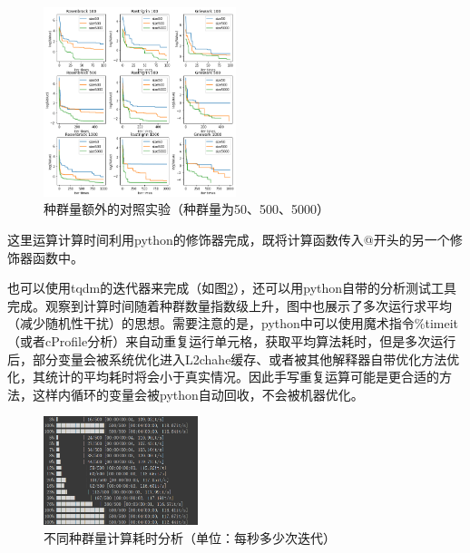 \documentclass[lang=cn,11pt]{elegantpaper}
\begin{document}
\begin{figure}[ht]
  \centering
  \includegraphics[width=0.5\textwidth]{figure/PSO/种群量额外的对照实验（种群量为50、500、5000）.png} %
  \caption{种群量额外的对照实验（种群量为50、500、5000）} %
  \label{img:种群量额外的对照实验}
\end{figure}

这里运算计算时间利用python的修饰器完成，既将计算函数传入@开头的另一个修饰器函数中。

也可以使用tqdm的迭代器来完成（如图\ref{img:不同种群量计算耗时分析}），还可以用python自带的分析测试工具完成。观察到计算时间随着种群数量指数级上升，图中也展示了多次运行求平均（减少随机性干扰）的思想。需要注意的是，python中可以使用魔术指令\%timeit（或者cProfile分析）来自动重复运行单元格，获取平均算法耗时，但是多次运行后，部分变量会被系统优化进入L2chahe缓存、或者被其他解释器自带优化方法优化，其统计的平均耗时将会小于真实情况。因此手写重复运算可能是更合适的方法，这样内循环的变量会被python自动回收，不会被机器优化。

\begin{figure}[ht]
  \centering
  \includegraphics[width=0.4\textwidth]{figure/PSO/提前停止位置（W从0.05增加到1）.png} %
  \caption{不同种群量计算耗时分析（单位：每秒多少次迭代）} %
  \label{img:不同种群量计算耗时分析}
\end{figure}
\end{document}
